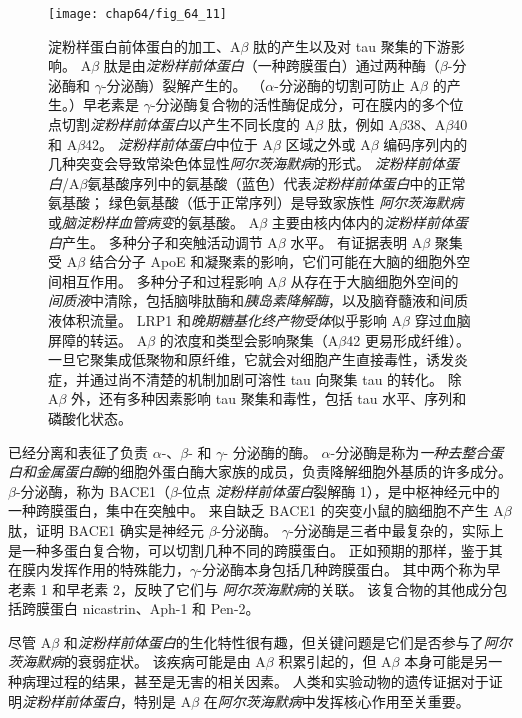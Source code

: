 \begin{figure}[htbp]
	\centering
	\texttt{[image: chap64/fig\_64\_11]}
	\caption{淀粉样蛋白前体蛋白的加工、A$\beta$ 肽的产生以及对 tau 聚集的下游影响。
		A$\beta$ 肽是由\textit{淀粉样前体蛋白}（一种跨膜蛋白）通过两种酶（$\beta$-分泌酶和 $\gamma$-分泌酶）裂解产生的。
		（$\alpha$-分泌酶的切割可防止 A$\beta$ 的产生。）早老素是 $\gamma$-分泌酶复合物的活性酶促成分，可在膜内的多个位点切割\textit{淀粉样前体蛋白}以产生不同长度的 A$\beta$ 肽，例如 A$\beta$38、A$\beta$40 和 A$\beta$42。
		\textit{淀粉样前体蛋白}中位于 A$\beta$ 区域之外或 A$\beta$ 编码序列内的几种突变会导致常染色体显性\textit{阿尔茨海默病}的形式。 
		\textit{淀粉样前体蛋白}/A$\beta$氨基酸序列中的氨基酸（蓝色）代表\textit{淀粉样前体蛋白}中的正常氨基酸；
		绿色氨基酸（低于正常序列）是导致家族性 \textit{阿尔茨海默病}或\textit{脑淀粉样血管病变}的氨基酸。
		A$\beta$ 主要由核内体内的\textit{淀粉样前体蛋白}产生。
		多种分子和突触活动调节 A$\beta$ 水平。
		有证据表明 A$\beta$ 聚集受 A$\beta$ 结合分子 ApoE 和凝聚素的影响，它们可能在大脑的细胞外空间相互作用。
		多种分子和过程影响 A$\beta$ 从存在于大脑细胞外空间的\textit{间质液}中清除，包括脑啡肽酶和\textit{胰岛素降解酶}，以及脑脊髓液和间质液体积流量。
		LRP1 和\textit{晚期糖基化终产物受体}似乎影响 A$\beta$ 穿过血脑屏障的转运。
		A$\beta$ 的浓度和类型会影响聚集（A$\beta$42 更易形成纤维）。
		一旦它聚集成低聚物和原纤维，它就会对细胞产生直接毒性，诱发炎症，并通过尚不清楚的机制加剧可溶性 tau 向聚集 tau 的转化。
		除 A$\beta$ 外，还有多种因素影响 tau 聚集和毒性，包括 tau 水平、序列和磷酸化状态。}
	\label{fig:64_11}
\end{figure}


已经分离和表征了负责 $\alpha$-、$\beta$- 和 $\gamma$- 分泌酶的酶。
$\alpha$-分泌酶是称为\textit{一种去整合蛋白和金属蛋白酶}的细胞外蛋白酶大家族的成员，负责降解细胞外基质的许多成分。
$\beta$-分泌酶，称为 BACE1（$\beta$-位点 \textit{淀粉样前体蛋白}裂解酶 1），是中枢神经元中的一种跨膜蛋白，集中在突触中。
来自缺乏 BACE1 的突变小鼠的脑细胞不产生 A$\beta$ 肽，证明 BACE1 确实是神经元 $\beta$-分泌酶。
$\gamma$-分泌酶是三者中最复杂的，实际上是一种多蛋白复合物，可以切割几种不同的跨膜蛋白。
正如预期的那样，鉴于其在膜内发挥作用的特殊能力，$\gamma$-分泌酶本身包括几种跨膜蛋白。
其中两个称为早老素 1 和早老素 2，反映了它们与 \textit{阿尔茨海默病}的关联。
该复合物的其他成分包括跨膜蛋白 nicastrin、Aph-1 和 Pen-2。


尽管 A$\beta$ 和\textit{淀粉样前体蛋白}的生化特性很有趣，但关键问题是它们是否参与了\textit{阿尔茨海默病}的衰弱症状。
该疾病可能是由 A$\beta$ 积累引起的，但 A$\beta$ 本身可能是另一种病理过程的结果，甚至是无害的相关因素。
人类和实验动物的遗传证据对于证明\textit{淀粉样前体蛋白}，特别是 A$\beta$ 在\textit{阿尔茨海默病}中发挥核心作用至关重要。


